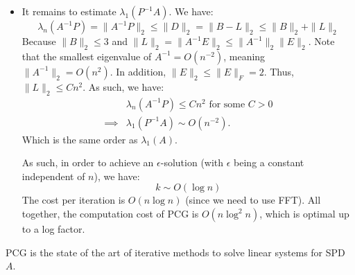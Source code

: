\documentclass[../main/main.tex]{subfiles}
\begin{document}
\begin{itemize}
  \item It remains to estimate  $\lambda _{1}(P^{-1} A)$. We have: \[
\lambda _{n}(A^{-1}P) = \|A^{-1}P\|_{2}\leq \|D\|_{2}= \|B-L\|_{2}\leq  \|B\|_{2}+\|L\|_{2}
        \]
        Because $\|B\|_{2}\leq 3$ and $\|L\|_{2} = \|A^{-1}E\|_{2} \leq  \|A^{-1}\|_{2}\|E\|_{2}$.
        Note that the smallest eigenvalue of $A^{-1} = O(n^{-2})$, meaning $\|A^{-1}\|_{2} = O(n^2)$. In addition, $\|E\|_{2}\leq \|E\|_{F}=2$. Thus, $\|L\|_{2}\leq Cn^2$. As such, we have: \begin{align*}
                                                                                                                                                                                                &\lambda _{n}(A^{-1}P)\leq  Cn^2 \text{ for some }C >0\\
                                                                                                                                                                                                \implies &\lambda _{1}(P^{-1}A) \sim O(n^{-2}) .\end{align*}
        Which is the same order as $\lambda _{1}(A)$.

        As such, in order to achieve an $\epsilon $-solution (with $\epsilon $ being a constant independent of $n$), we have: \[
k\sim O(\log n)
        \]
        The cost per iteration is $O(n\log n)$ (since we need to use FFT). All together, the computation cost of PCG is $O(n\log^2n)$, which is optimal up to a log factor.
\end{itemize}
\begin{remark}
PCG is the state of the art of iterative methods to solve linear systems for SPD $A$.
\end{remark}
\end{document}
